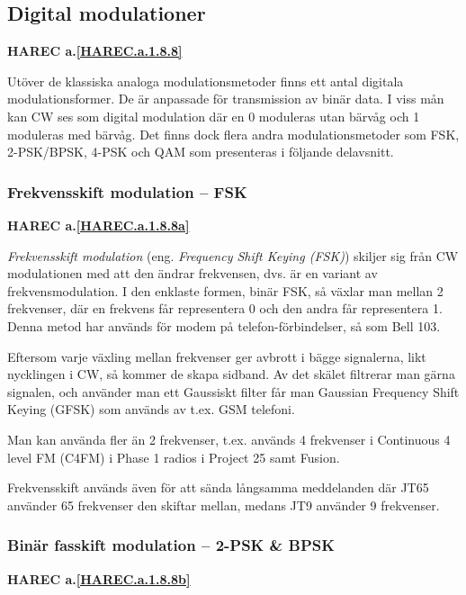 \subsection{Digital modulationer}
\textbf{HAREC a.\ref{HAREC.a.1.8.8}\label{myHAREC.a.1.8.8}}

Utöver de klassiska analoga modulationsmetoder finns ett antal digitala
modulationsformer.
De är anpassade för transmission av binär data.
I viss mån kan CW ses som digital modulation där en 0 moduleras utan bärvåg
och 1 moduleras med bärvåg.
Det finns dock flera andra modulationsmetoder som FSK, 2-PSK/BPSK, 4-PSK och
QAM som presenteras i följande delavsnitt.

\subsubsection{Frekvensskift modulation -- FSK}
\textbf{HAREC a.\ref{HAREC.a.1.8.8a}\label{myHAREC.a.1.8.8a}}

\emph{Frekvensskift modulation} (eng. \emph{Frequency Shift Keying (FSK)})
skiljer sig från CW modulationen med att den ändrar frekvensen, dvs. är en
variant av frekvensmodulation. I den enklaste formen, binär FSK, så växlar man
mellan 2 frekvenser, där en frekvens får representera 0 och den andra får
representera 1. Denna metod har används för modem på telefon-förbindelser,
så som Bell 103.

Eftersom varje växling mellan frekvenser ger avbrott i bägge signalerna,
likt nycklingen i CW, så kommer de skapa sidband. Av det skälet filtrerar man
gärna signalen, och använder man ett Gaussiskt filter får man Gaussian Frequency
Shift Keying (GFSK) som används av t.ex. GSM telefoni.

Man kan använda fler än 2 frekvenser, t.ex. används 4 frekvenser i Continuous
4 level FM (C4FM) i Phase 1 radios i Project 25 samt Fusion.

Frekvensskift används även för att sända långsamma meddelanden där JT65
använder 65 frekvenser den skiftar mellan, medans JT9 använder 9 frekvenser.

\subsubsection{Binär fasskift modulation -- 2-PSK \& BPSK}
\textbf{HAREC a.\ref{HAREC.a.1.8.8b}\label{myHAREC.a.1.8.8b}}

